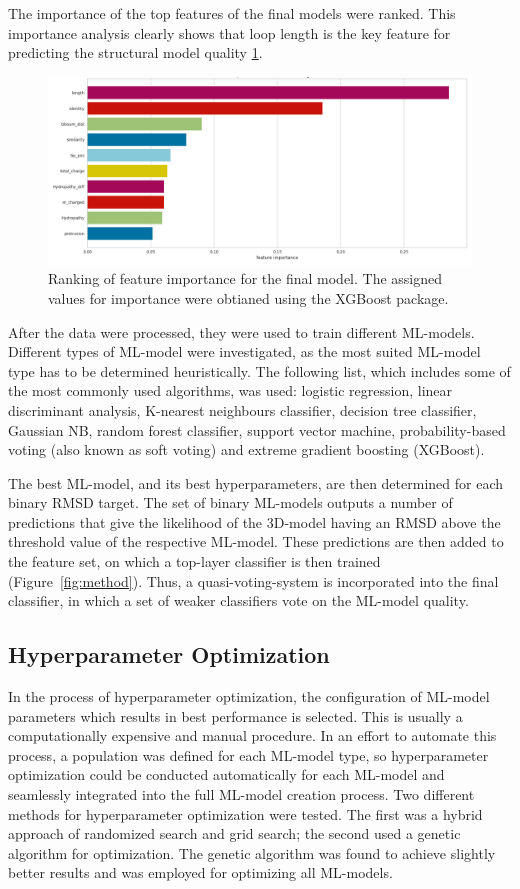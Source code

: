 The importance of the top features of the final models were ranked. This importance analysis clearly shows that loop length is the key feature for predicting the structural model quality \ref{fig:importance}. 
\begin{figure}
  \centering
  \includegraphics[width=\linewidth]{importance.png}
  \caption {Ranking of feature importance for the final model. The assigned values for importance were obtianed using the XGBoost package. \cite{Chen2016}}
  \label{fig:importance}
\end{figure}


After the data were processed, they were used to train different
ML-models. Different types of ML-model were investigated, as the most
suited ML-model type has to be determined heuristically. 
The following list, which includes some of the most commonly used
algorithms, was used: logistic regression, linear discriminant analysis,
K-nearest neighbours classifier, decision tree classifier, Gaussian
NB, random forest classifier, support vector machine,
probability-based voting (also known as soft voting) and extreme
gradient boosting (XGBoost)\cite{Chen2016}.

The best ML-model, and its best hyperparameters, are then determined for
each binary RMSD target. The set of binary ML-models outputs a number of
predictions that give the likelihood of the 3D-model having an RMSD above
the threshold value of the respective ML-model. These predictions are
then added to the feature set, on which a top-layer classifier is then
trained (Figure~\ref{fig:method}). Thus, a quasi-voting-system is incorporated into the final
classifier, in which a set of weaker classifiers vote on the ML-model
quality.

\subsection{Hyperparameter Optimization}
In the process of hyperparameter optimization, the configuration of
ML-model parameters which results in best performance is selected. This
is usually a computationally expensive and manual procedure.
In an effort to automate this process, a population was defined for
each ML-model type, so hyperparameter optimization could be conducted
automatically for each ML-model and seamlessly integrated into the full
ML-model creation process. Two different methods for hyperparameter
optimization were tested. The first was a hybrid approach of randomized
search and grid search; the second used a genetic algorithm for
optimization. The genetic algorithm was found to achieve slightly
better results and was employed for optimizing all ML-models.

